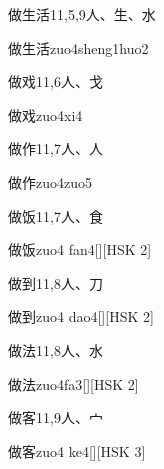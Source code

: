 \begin{Entry}{做生活}{11,5,9}{⼈、⽣、⽔}
  \begin{Phonetics}{做生活}{zuo4sheng1huo2}
  \end{Phonetics}
\end{Entry}

\begin{Entry}{做戏}{11,6}{⼈、⼽}
  \begin{Phonetics}{做戏}{zuo4xi4}
  \end{Phonetics}
\end{Entry}

\begin{Entry}{做作}{11,7}{⼈、⼈}
  \begin{Phonetics}{做作}{zuo4zuo5}
  \end{Phonetics}
\end{Entry}

\begin{Entry}{做饭}{11,7}{⼈、⾷}
  \begin{Phonetics}{做饭}{zuo4 fan4}[][HSK 2]
  \end{Phonetics}
\end{Entry}

\begin{Entry}{做到}{11,8}{⼈、⼑}
  \begin{Phonetics}{做到}{zuo4 dao4}[][HSK 2]
  \end{Phonetics}
\end{Entry}

\begin{Entry}{做法}{11,8}{⼈、⽔}
  \begin{Phonetics}{做法}{zuo4fa3}[][HSK 2]
  \end{Phonetics}
\end{Entry}

\begin{Entry}{做客}{11,9}{⼈、⼧}
  \begin{Phonetics}{做客}{zuo4 ke4}[][HSK 3]
  \end{Phonetics}
\end{Entry}

